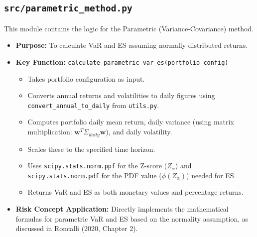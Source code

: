\documentclass[11pt,a4paper]{article}
\begin{document}
\subsection{\texttt{src/parametric\_method.py}}
This module contains the logic for the Parametric (Variance-Covariance) method.
\begin{itemize}
    \item \textbf{Purpose:} To calculate VaR and ES assuming normally distributed returns.
    \item \textbf{Key Function:} \texttt{calculate\_parametric\_var\_es(portfolio\_config)}
        \begin{itemize}
            \item Takes portfolio configuration as input.
            \item Converts annual returns and volatilities to daily figures using \texttt{convert\_annual\_to\_daily} from \texttt{utils.py}.
            \item Computes portfolio daily mean return, daily variance (using matrix multiplication: $\mathbf{w}^T \Sigma_{daily} \mathbf{w}$), and daily volatility.
            \item Scales these to the specified time horizon.
            \item Uses \texttt{scipy.stats.norm.ppf} for the Z-score ($Z_{\alpha}$) and \texttt{scipy.stats.norm.pdf} for the PDF value ($\phi(Z_{\alpha})$) needed for ES.
            \item Returns VaR and ES as both monetary values and percentage returns.
        \end{itemize}
    \item \textbf{Risk Concept Application:} Directly implements the mathematical formulas for parametric VaR and ES based on the normality assumption, as discussed in Roncalli (2020, Chapter 2).
\end{itemize}
\end{document}
